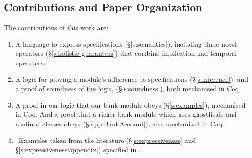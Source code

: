  
 
  
\subsection{Contributions and Paper Organization}


%
The contributions of this {work} are:
\begin{enumerate}
\item   A language to express \Nec specifications (\S\ref{s:semantics}), including three novel \Nec operators (\S\ref{s:holistic-guarantees}) that combine implication and temporal operators.  

 \item
A logic for proving a module's adherence to 
 \Nec specifications (\S\ref{s:inference}), and a proof of soundness of the logic, (\S\ref{s:soundness}),
both mechanised in Coq. 
 \item
A proof in our logic %
  that our bank module {obeys} %
  \SrobustB (\S\ref{s:examples}),     mechanised in Coq.
  And a proof that
  a richer bank module which uses ghostfields and confined classes  obeys  \SrobustB (\S\ref{app:BankAccount}),
  also mechanised in Coq \cite{necessityCoq2022}.
\item \ {Examples taken from the literature  (\S\ref{s:expressiveness} and \S\ref{s:expressiveness:appendix}) specified in \Nec  .}

\end{enumerate}




